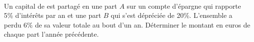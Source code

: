 \documentclass[main.tex]{subfiles}
\begin{document}
\begin{exercise}\hfill \\
	Un capital de  est partagé  en une part $A$ sur un compte d’épargne qui rapporte 5\% d’intérêts par an et une part $B$ qui s'est dépréciée de 20\%. L'ensemble a perdu 6\% de sa valeur totale au bout d’un an.  
	Déterminer le montant en euros de chaque part l'année précédente.
\end{exercise}  
 


\newpage 
{}  
\pagestyle{scrheadings} %
\onehalfspacing
\end{document}
